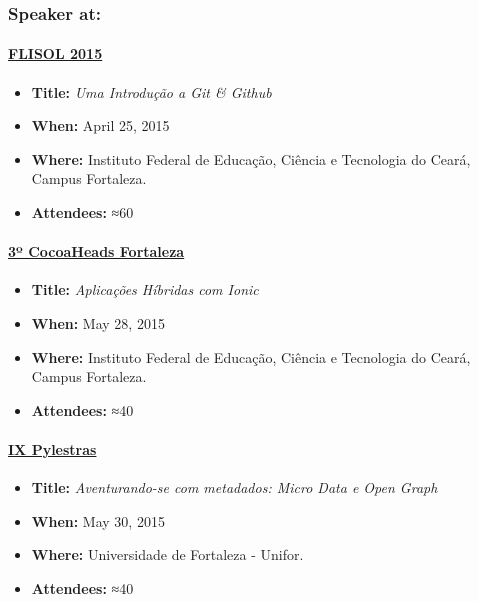 \documentclass[]{article}
\providecommand{\tightlist}{%
  \setlength{\itemsep}{0pt}\setlength{\parskip}{0pt}}
\let\oldparagraph\paragraph
\renewcommand{\paragraph}[1]{\oldparagraph{#1}\mbox{}}
\begin{document}
\subsubsection{Speaker at:}\label{speaker-at}

\paragraph{\texorpdfstring{\href{http://flisolce.org/}{FLISOL
2015}}{FLISOL 2015}}\label{flisol-2015}

\begin{itemize}
\tightlist
\item
  \textbf{Title:} \emph{Uma Introdução a Git \& Github}
\item
  \textbf{When:} April 25, 2015
\item
  \textbf{Where:} Instituto Federal de Educação, Ciência e Tecnologia do
  Ceará, Campus Fortaleza.
\item
  \textbf{Attendees:} ≈60
\end{itemize}

\paragraph{\texorpdfstring{\href{http://www.cocoaheads.com.br/agendas/detalhes/79/}{3º
CocoaHeads
Fortaleza}}{3º CocoaHeads Fortaleza}}\label{uxba-cocoaheads-fortaleza}

\begin{itemize}
\tightlist
\item
  \textbf{Title:} \emph{Aplicações Híbridas com Ionic}
\item
  \textbf{When:} May 28, 2015
\item
  \textbf{Where:} Instituto Federal de Educação, Ciência e Tecnologia do
  Ceará, Campus Fortaleza.
\item
  \textbf{Attendees:} ≈40
\end{itemize}

\paragraph{\texorpdfstring{\href{http://pylestras.org/evento/ix-pylestras/}{IX
Pylestras}}{IX Pylestras}}\label{ix-pylestras}

\begin{itemize}
\tightlist
\item
  \textbf{Title:} \emph{Aventurando-se com metadados: Micro Data e Open
  Graph}
\item
  \textbf{When:} May 30, 2015
\item
  \textbf{Where:} Universidade de Fortaleza - Unifor.
\item
  \textbf{Attendees:} ≈40
\end{itemize}
\end{document}
